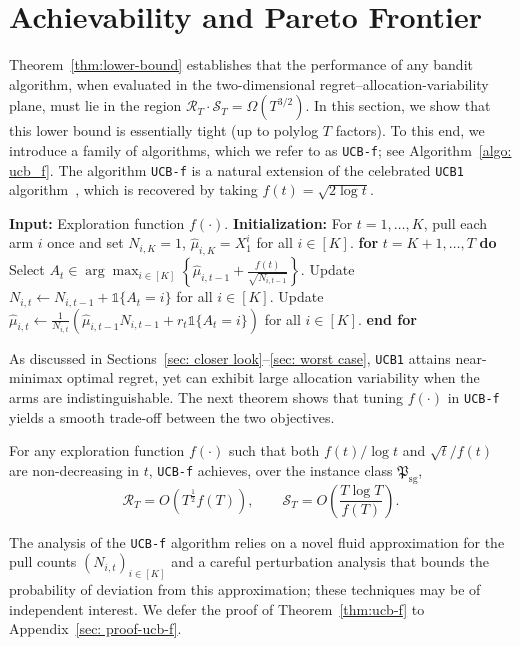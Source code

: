 \documentclass[nonblindrev]{informs3_noinforms}
\begin{document}
\section{Achievability and Pareto Frontier}\label{sec:algorithm}
{
Theorem~\ref{thm:lower-bound} establishes that the performance of any bandit algorithm, when evaluated in the two-dimensional regret--allocation-variability plane, must lie in the region $\mathcal{R}_T\cdot\mathcal{S}_T=\Omega\!\left(T^{3/2}\right).$ In this section, we show that this lower bound is essentially tight (up to polylog $T$ factors). To this end, we introduce a family of algorithms, which we refer to as \texttt{UCB-f}; see Algorithm~\ref{algo: ucb_f}. The algorithm \texttt{UCB-f} is a natural extension of the celebrated \texttt{UCB1} algorithm~\cite{auer2002finite}, which is recovered by taking $f(t)=\sqrt{2\log t}$.
\begin{algorithm}
    \caption{{\sf UCB-f}}
    \label{algo: ucb_f}
    \begin{algorithmic}[1]
        \State \textbf{Input:} Exploration function $f(\cdot)$.
        \State \textbf{Initialization:} For $t=1,\dots,K$, pull each arm $i$ once and set
        $N_{i,K}=1$, $\widehat\mu_{i, K}=X^{i}_1$ for all $i\in[K]$. 
        \State \textbf{for} $t=K+1,\dots,T$ \textbf{do}
        \State \quad Select $A_t\in \arg\max_{i\in[K]}\left\{\widehat\mu_{i,t-1}+\frac{f(t)}{\sqrt{N_{i,t-1}}}\right\}$.
        \State \quad Update $N_{i,t}\leftarrow N_{i,t-1}+\mathds{1}\{A_t=i\}$ for all $i\in[K]$.
        \State \quad Update $\widehat\mu_{i,t}\leftarrow \frac{1}{N_{i,t}}\left(\widehat\mu_{i, t-1} N_{i, t-1}+r_t\mathds{1}\{A_t=i\}\right)$ for all $i\in[K]$.
        \State \textbf{end for}
    \end{algorithmic}
\end{algorithm}
As discussed in Sections~\ref{sec: closer look}--\ref{sec: worst case}, \texttt{UCB1} attains near-minimax optimal regret, yet can exhibit large allocation variability when the arms are indistinguishable. The next theorem shows that tuning $f(\cdot)$ in \texttt{UCB-f} yields a smooth trade-off between the two objectives.


\begin{theorem}\label{thm:ucb-f}
For any exploration function $f(\cdot)$ such that both $f(t)/\log t$ and $\sqrt{t}/f(t)$ are non-decreasing in $t$, \texttt{UCB-f} achieves, over the instance class $\mathfrak{P}_{\mathrm{sg}}$,
\[
\mathcal{R}_T = O\!\left(T^{\frac12}f(T)\right),
\qquad
\mathcal{S}_T = O\!\left(\frac{T \log T}{f(T)}\right).
\]
\end{theorem}
The analysis of the \texttt{UCB-f} algorithm relies on a novel fluid approximation for the pull counts $(N_{i,t})_{i\in[K]}$ and a careful perturbation analysis that bounds the probability of deviation from this approximation; these techniques may be of independent interest. We defer the proof of Theorem~\ref{thm:ucb-f} to Appendix~\ref{sec: proof-ucb-f}.



}
\end{document}
